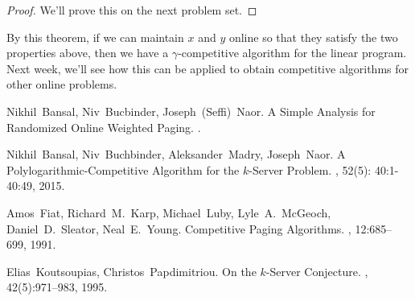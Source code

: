 \documentclass[11pt]{article}
\begin{document}
\begin{proof}
  We'll prove this on the next problem set.
\end{proof}

By this theorem, if we can maintain $x$ and $y$ online so that they satisfy the two properties above, then we have a $\gamma$-competitive algorithm for the linear program. Next week, we'll see how this can be applied to obtain competitive algorithms for other online problems.



\begin{thebibliography}{42}

Nikhil~Bansal, Niv~Bucbinder, Joseph~(Seffi)~Naor.
\newblock A Simple Analysis for Randomized Online Weighted Paging.
.

Nikhil~Bansal, Niv~Buchbinder, Aleksander~Madry, Joseph~Naor.
\newblock A Polylogarithmic-Competitive Algorithm for the $k$-Server Problem.
, 52(5): 40:1-40:49, 2015.

Amos~Fiat, Richard~M.~Karp, Michael~Luby, Lyle~A.~McGeoch, Daniel~D.~Sleator, Neal~E.~Young.
\newblock Competitive Paging Algorithms.
, 12:685--699, 1991.

Elias~Koutsoupias, Christos~Papdimitriou.
\newblock On the $k$-Server Conjecture.
, 42(5):971--983, 1995.

\end{thebibliography}
\end{document}
